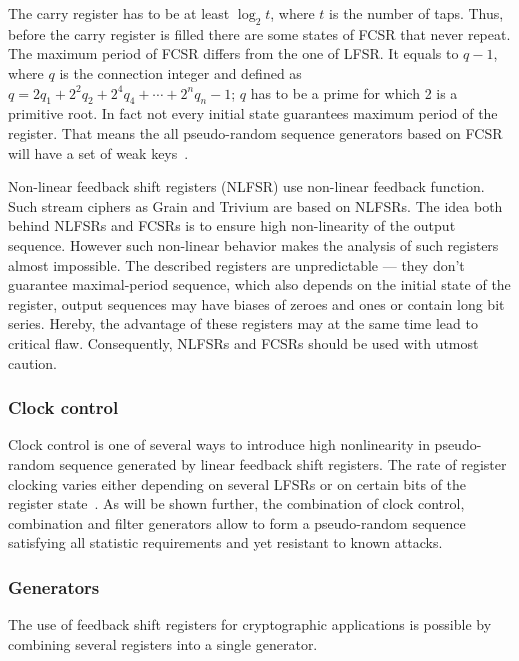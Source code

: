 The carry register has to be at least $\log_2 t$, where $t$ is the number of
taps. Thus, before the carry register is
filled there are some states of FCSR that never repeat. The maximum period of
FCSR differs from the one of LFSR. It equals to $q - 1$, where $q$ is the
connection integer and defined as 
\mbox{$q = 2 q_1 + 2^2 q_2 + 2^4 q_4 + \cdots + 2^n q_n - 1$}; $q$ has to be a prime
for which 2 is a primitive root. In fact not every initial state guarantees
maximum period of the register. That means the all pseudo-random sequence
generators based on FCSR will have a set of weak
keys~\cite{schneier:applied_cryptography:2}.

Non-linear feedback shift registers (NLFSR) use non-linear feedback function.
Such stream ciphers as Grain and Trivium are based on NLFSRs. The idea both
behind NLFSRs and FCSRs is to ensure high non-linearity of the output sequence.
However such non-linear behavior makes the analysis of such registers almost
impossible. The described registers are unpredictable --- they don't guarantee
maximal-period sequence, which also depends on the initial state of the register,
output sequences may have biases of zeroes and ones or contain long bit series.
Hereby, the advantage of these registers may at the same time lead to critical
flaw. Consequently, NLFSRs and FCSRs should be used with utmost caution.


\subsubsection{Clock control}

Clock control is one of several ways to introduce high nonlinearity in
pseudo-random sequence generated by linear feedback shift registers. The rate of
register clocking varies either depending on several LFSRs or on certain bits
of the register state~\cite{usm:streamciphers}. As will be shown further, the combination of clock
control, combination and filter generators allow to form a pseudo-random
sequence satisfying all statistic requirements and yet resistant to known
attacks.

\subsubsection{Generators}                          

The use of feedback shift registers for cryptographic applications is possible by
combining several registers into a single generator. 

